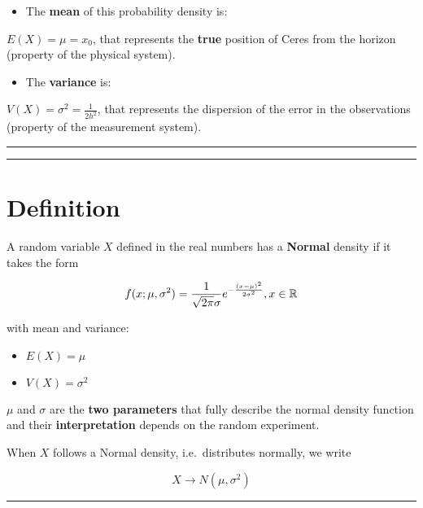 \documentclass[
]{book}
\providecommand{\tightlist}{%
  \setlength{\itemsep}{0pt}\setlength{\parskip}{0pt}}
\begin{document}
\begin{itemize}
\tightlist
\item
  The \textbf{mean} of this probability density is:
\end{itemize}

\(E(X)=\mu=x_0\), that represents the \textbf{true} position of Ceres from the horizon (property of the physical system).

\begin{itemize}
\tightlist
\item
  The \textbf{variance} is:
\end{itemize}

\(V(X)=\sigma^2=\frac{1}{2h^2}\), that represents the dispersion of the error in the observations (property of the measurement system).

\begin{center}\rule{0.5\linewidth}{0.5pt}\end{center}

\begin{center}\rule{0.5\linewidth}{0.5pt}\end{center}

\hypertarget{definition}{%
\section{Definition}\label{definition}}

A random variable \(X\) defined in the real numbers has a \textbf{Normal} density if it takes the form

\[f(x; \mu, \sigma^2)=\frac{1}{\sqrt{2\pi}\sigma}e^{-\frac{(x-\mu)^2}{2\sigma^2}}, x \in {\Bbb R}\]

with mean and variance:

\begin{itemize}
\tightlist
\item
  \(E (X) = \mu\)
\item
  \(V (X) = \sigma^2\)
\end{itemize}

\(\mu\) and \(\sigma\) are the \textbf{two parameters} that fully describe the normal density function and their \textbf{interpretation} depends on the random experiment.

When \(X\) follows a Normal density, i.e.~distributes normally, we write

\[X\rightarrow N(\mu,\sigma^2)\]

\begin{center}\rule{0.5\linewidth}{0.5pt}\end{center}
\end{document}
